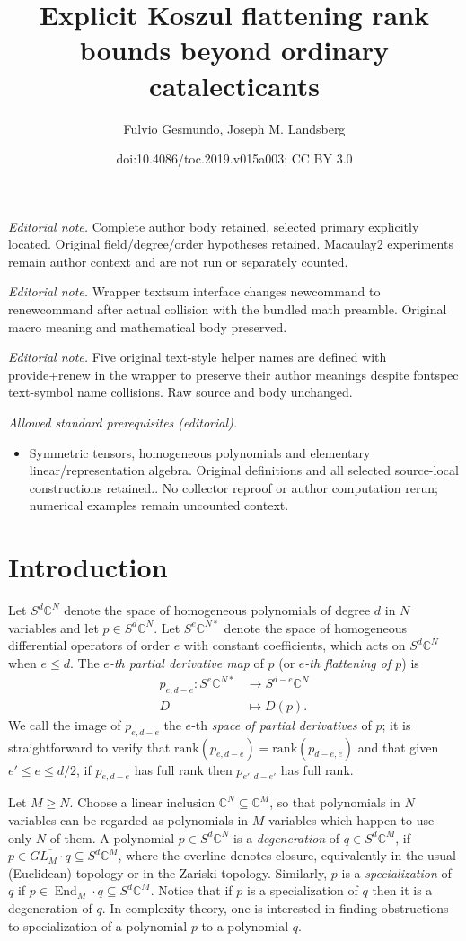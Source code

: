 \documentclass[11pt]{article}
\title{Explicit Koszul flattening rank bounds beyond ordinary catalecticants}
\author{Fulvio Gesmundo, Joseph M. Landsberg}
\date{doi:10.4086/toc.2019.v015a003; CC BY 3.0}
\numberwithin{equation}{section}
\theoremstyle{definition}
\theoremstyle{plain}
\newcommand{\bbC}{\mathbb{C}}
\DeclareMathOperator{\End}{End}
\def\BC{\mathbb C}
\def\trank{\mathrm{rank}}
\begin{document}
\maketitle
\noindent\textit{Editorial note.} Complete author body retained, selected primary explicitly located. Original field/degree/order hypotheses retained. Macaulay2 experiments remain author context and are not run or separately counted.\par\medskip
\noindent\textit{Editorial note.} Wrapper textsum interface changes newcommand to renewcommand after actual collision with the bundled math preamble. Original macro meaning and mathematical body preserved.\par\medskip
\noindent\textit{Editorial note.} Five original text-style helper names are defined with provide+renew in the wrapper to preserve their author meanings despite fontspec text-symbol name collisions. Raw source and body unchanged.\par\medskip
\noindent\textit{Allowed standard prerequisites (editorial).}\begin{itemize}
\item Symmetric tensors, homogeneous polynomials and elementary linear/representation algebra. Original definitions and all selected source-local constructions retained.. No collector reproof or author computation rerun; numerical examples remain uncounted context.
\end{itemize}\medskip
\section{Introduction} 
 Let $S^d\BC^N$ denote the space of homogeneous polynomials of degree $d$ in $N$ variables and let $p\in S^d\BC^N$. Let $S^e\BC^{N*}$ denote the space of homogeneous differential operators of order $e$ with constant coefficients, which acts on $S^d\BC^N$ when $e\leq d$. The \emph{$e$-th partial derivative map}  of $p$  (or \emph{$e$-th flattening of $p$}) is
\begin{align} \label{flateqn}
p_{e,d-e}: S^e\BC^{N*}& \to S^{d-e}\BC^N\\
\nonumber D & \mapsto D(p).
\end{align}
 We call the image of $p_{e,d-e}$ the $e$-th \emph{space of partial derivatives} of $p$; it is straightforward to verify that $\trank (p_{e,d-e}) = \trank (p_{d-e,e})$ and that given $e' \leq e \leq d/2$, if $p_{e,d-e}$ has full rank then $p_{e',d-e'}$ has full rank.

Let $M\geq N$. Choose a linear inclusion $\bbC^N \subseteq \bbC^M$, so that polynomials in $N$ variables can be regarded as polynomials in $M$ variables which happen to use only $N$ of them. A polynomial $p\in S^d\BC^N$ is a \emph{degeneration} of $q\in S^d\BC^M$, if  $p\in \overline{GL_M\cdot q}\subseteq S^d\BC^M$, where the overline denotes closure, equivalently in the usual (Euclidean) topology or in the Zariski topology.  Similarly, $p$ is a \emph{specialization} of $q$ if $p \in \End_{M} \cdot q \subseteq S^d \bbC^M$. Notice that if $p$ is a specialization of $q$ then it is a degeneration of $q$. In complexity theory, one is interested in finding obstructions to specialization of a polynomial $p$ to a polynomial $q$.  
\end{document}
